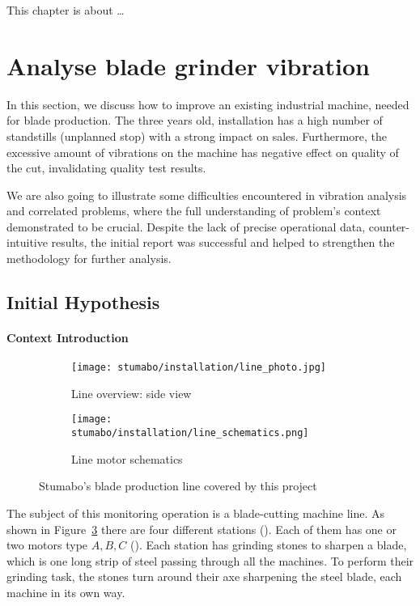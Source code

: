This chapter is about \dots

\section{Analyse blade grinder vibration}
In this section, we discuss how to improve an existing industrial machine, needed for blade production.
The three years old, installation has a high number of standstills (unplanned stop) with a strong impact on sales.
Furthermore, the excessive amount of vibrations on the machine has negative effect on quality of the cut, invalidating quality test results.

We are also going to illustrate some difficulties encountered in vibration analysis and correlated problems, where 
the full understanding of problem's context demonstrated to be crucial.
Despite the lack of precise operational data, counter-intuitive results, the initial report was successful and helped to strengthen the methodology for further analysis.

\subsection{Initial Hypothesis}
\paragraph{Context Introduction}
\begin{figure}[ht]
    \begin{subfigure}{\textwidth}
        \texttt{[image: stumabo/installation/line\_photo.jpg]}
        \caption{Line overview: side view}
        \label{fig:line_overview}
    \end{subfigure}
    \begin{subfigure}{\textwidth}
        \texttt{[image: stumabo/installation/line\_schematics.png]}
        \caption{Line motor schematics}
        \label{fig:line_schematics}
    \end{subfigure}
    \caption{Stumabo's blade production line covered by this project}
    \label{fig:stumabo_prod_line}
\end{figure}
The subject of this monitoring operation is a blade-cutting machine line.
As shown in Figure~\ref{fig:stumabo_prod_line} there are four different stations (). Each of them has one or two motors type ${A,B,C}$ ().
Each station has grinding stones to sharpen a blade, which is one long strip of steel passing through all the machines.
To perform their grinding task, the stones turn around their axe sharpening the steel blade, each machine in its own way.

